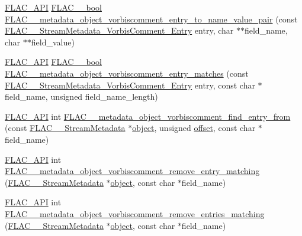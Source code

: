 \begin{DoxyCompactItemize}
\item 
\mbox{\hyperlink{group__flac__export_ga56ca07df8a23310707732b1c0007d6f5}{F\+L\+A\+C\+\_\+\+A\+PI}} \mbox{\hyperlink{ordinals_8h_a95103469f1cbd78b8cf250194985b34e}{F\+L\+A\+C\+\_\+\+\_\+bool}} \mbox{\hyperlink{group__flac__metadata__object_gaca557b35c7c1ac19e30794bcf529746b}{F\+L\+A\+C\+\_\+\+\_\+metadata\+\_\+object\+\_\+vorbiscomment\+\_\+entry\+\_\+to\+\_\+name\+\_\+value\+\_\+pair}} (const \mbox{\hyperlink{struct_f_l_a_c_____stream_metadata___vorbis_comment___entry}{F\+L\+A\+C\+\_\+\+\_\+\+Stream\+Metadata\+\_\+\+Vorbis\+Comment\+\_\+\+Entry}} entry, char $\ast$$\ast$field\+\_\+name, char $\ast$$\ast$field\+\_\+value)
\item 
\mbox{\hyperlink{group__flac__export_ga56ca07df8a23310707732b1c0007d6f5}{F\+L\+A\+C\+\_\+\+A\+PI}} \mbox{\hyperlink{ordinals_8h_a95103469f1cbd78b8cf250194985b34e}{F\+L\+A\+C\+\_\+\+\_\+bool}} \mbox{\hyperlink{group__flac__metadata__object_gac31ee3de9f9931628f120cb611bb0f20}{F\+L\+A\+C\+\_\+\+\_\+metadata\+\_\+object\+\_\+vorbiscomment\+\_\+entry\+\_\+matches}} (const \mbox{\hyperlink{struct_f_l_a_c_____stream_metadata___vorbis_comment___entry}{F\+L\+A\+C\+\_\+\+\_\+\+Stream\+Metadata\+\_\+\+Vorbis\+Comment\+\_\+\+Entry}} entry, const char $\ast$field\+\_\+name, unsigned field\+\_\+name\+\_\+length)
\item 
\mbox{\hyperlink{group__flac__export_ga56ca07df8a23310707732b1c0007d6f5}{F\+L\+A\+C\+\_\+\+A\+PI}} int \mbox{\hyperlink{group__flac__metadata__object_gae094c1ce4f248d49e8c099661bd5288e}{F\+L\+A\+C\+\_\+\+\_\+metadata\+\_\+object\+\_\+vorbiscomment\+\_\+find\+\_\+entry\+\_\+from}} (const \mbox{\hyperlink{struct_f_l_a_c_____stream_metadata}{F\+L\+A\+C\+\_\+\+\_\+\+Stream\+Metadata}} $\ast$\mbox{\hyperlink{_s_d_l__opengl__glext_8h_ab49790263c78300fbf05719e38246198}{object}}, unsigned \mbox{\hyperlink{_s_d_l__opengl__glext_8h_ac915cd848f42b26af51745f204a3b9af}{offset}}, const char $\ast$field\+\_\+name)
\item 
\mbox{\hyperlink{group__flac__export_ga56ca07df8a23310707732b1c0007d6f5}{F\+L\+A\+C\+\_\+\+A\+PI}} int \mbox{\hyperlink{group__flac__metadata__object_ga6812052a110800bef2f4139017501507}{F\+L\+A\+C\+\_\+\+\_\+metadata\+\_\+object\+\_\+vorbiscomment\+\_\+remove\+\_\+entry\+\_\+matching}} (\mbox{\hyperlink{struct_f_l_a_c_____stream_metadata}{F\+L\+A\+C\+\_\+\+\_\+\+Stream\+Metadata}} $\ast$\mbox{\hyperlink{_s_d_l__opengl__glext_8h_ab49790263c78300fbf05719e38246198}{object}}, const char $\ast$field\+\_\+name)
\item 
\mbox{\hyperlink{group__flac__export_ga56ca07df8a23310707732b1c0007d6f5}{F\+L\+A\+C\+\_\+\+A\+PI}} int \mbox{\hyperlink{group__flac__metadata__object_ga525525f5f21b1caee776cba3cfb6d72f}{F\+L\+A\+C\+\_\+\+\_\+metadata\+\_\+object\+\_\+vorbiscomment\+\_\+remove\+\_\+entries\+\_\+matching}} (\mbox{\hyperlink{struct_f_l_a_c_____stream_metadata}{F\+L\+A\+C\+\_\+\+\_\+\+Stream\+Metadata}} $\ast$\mbox{\hyperlink{_s_d_l__opengl__glext_8h_ab49790263c78300fbf05719e38246198}{object}}, const char $\ast$field\+\_\+name)

\end{DoxyCompactItemize}
